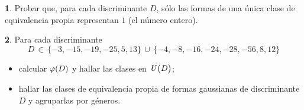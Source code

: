 \theoremstyle{definition}
\newtheorem{ejerAgrupar}{\ejername}[section]


\begin{ejerAgrupar}\label{ejer:agrupar:uno}
	Probar que, para cada discriminante $D$, s\'olo las formas de
	una \'unica clase de equivalencia propia representan $1$ (el
	n\'umero entero).
\end{ejerAgrupar}

\begin{ejerAgrupar}\label{ejer:agrupar}
	Para cada discriminante
	\begin{displaymath}
		D\,\in\,\{-3,-15,-19,-25,5,13\}\,\cup\,
			\{-4,-8,-16,-24,-28,-56,8,12\}
	\end{displaymath}
	\begin{itemize}
		\item calcular $\eulerphi(D)$ y hallar las clases en
			$\Unidadesmod[D]$;
		\item hallar las clases de equivalencia propia de formas
			gaussianas de discriminante $D$ y agruparlas por
			g\'eneros.
	\end{itemize}
\end{ejerAgrupar}

